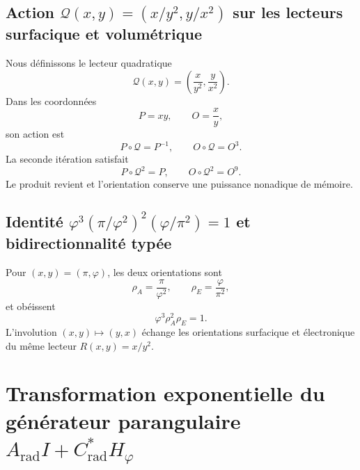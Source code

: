 \subsection{Action \texorpdfstring{\(\mathcal Q(x,y)=(x/y^2,y/x^2)\)}{Q(x,y)=(x/y^2,y/x^2)} sur les lecteurs surfacique et volumétrique}

Nous définissons le lecteur quadratique
\begin{equation}
 \mathcal Q(x,y)
 =\left(\frac{x}{y^2},\frac{y}{x^2}\right).
 \label{eq:l9s102:euler-q}
\end{equation}
Dans les coordonnées
\begin{equation}
 P=xy,
 \qquad O=\frac{x}{y},
 \label{eq:l9s102:euler-po}
\end{equation}
son action est
\begin{equation}
 P\circ\mathcal Q=P^{-1},
 \qquad
 O\circ\mathcal Q=O^3.
 \label{eq:l9s102:euler-q-action}
\end{equation}
La seconde itération satisfait
\begin{equation}
 \boxed{
 P\circ\mathcal Q^2=P,
 \qquad
 O\circ\mathcal Q^2=O^9.}
 \label{eq:l9s102:euler-q2}
\end{equation}
Le produit revient et l'orientation conserve une puissance nonadique de
mémoire.

\subsection{Identité \texorpdfstring{\(\varphi^3(\pi/\varphi^2)^2(\varphi/\pi^2)=1\)}{phi^3(pi/phi^2)^2(phi/pi^2)=1} et bidirectionnalité typée}

Pour \((x,y)=(\pi,\varphi)\), les deux orientations sont
\begin{equation}
 \rho_A=\frac{\pi}{\varphi^2},
 \qquad
 \rho_E=\frac{\varphi}{\pi^2},
 \label{eq:l9s102:euler-rho-a-e}
\end{equation}
et obéissent
\begin{equation}
 \boxed{\varphi^3\rho_A^2\rho_E=1.}
 \label{eq:l9s102:euler-ambivalencia-identidad}
\end{equation}
L'involution \((x,y)\mapsto(y,x)\) échange les orientations surfacique et
électronique du même lecteur \(R(x,y)=x/y^2\).

\section{Transformation exponentielle du générateur parangulaire \texorpdfstring{\(A_{\mathrm{rad}}I+C^*_{\mathrm{rad}}H_\varphi\)}{A_rad I+C*_rad H_phi}}
\label{sec:l9s102:euler-accion-par-angular}

